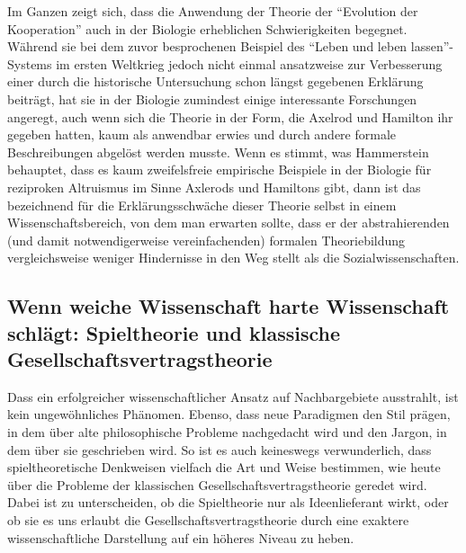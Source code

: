 \documentclass[12pt,a4paper,ngerman]{article}
\begin{document}
Im Ganzen zeigt sich, dass die Anwendung der Theorie der "`Evolution
der Kooperation"' auch in der Biologie erheblichen Schwierigkeiten
begegnet.  Während sie bei dem zuvor besprochenen Beispiel des "`Leben
und leben lassen"'-Systems im ersten Weltkrieg jedoch nicht einmal
ansatzweise zur Verbesserung einer durch die historische Untersuchung
schon längst gegebenen Erklärung beiträgt, hat sie in der Biologie
zumindest einige interessante Forschungen angeregt, auch wenn sich die
Theorie in der Form, die Axelrod und Hamilton ihr gegeben hatten, kaum
als anwendbar erwies und durch andere formale Beschreibungen abgelöst
werden musste. Wenn es stimmt, was Hammerstein behauptet, dass es kaum
zweifelsfreie empirische Beispiele in der Biologie für reziproken
Altruismus im Sinne Axlerods und Hamiltons gibt, dann ist das
bezeichnend für die Erklärungsschwäche dieser Theorie selbst in einem
Wissenschaftsbereich, von dem man erwarten sollte, dass er der
abstrahierenden (und damit notwendigerweise vereinfachenden) formalen
Theoriebildung vergleichsweise weniger Hindernisse in den Weg stellt
als die Sozialwissenschaften.


\subsection{Wenn weiche Wissenschaft harte Wissenschaft schlägt: Spieltheorie
und klassische Gesellschaftsvertragstheorie}

Dass ein erfolgreicher wissenschaftlicher Ansatz auf Nachbargebiete
ausstrahlt, ist kein ungewöhnliches Phänomen. Ebenso, dass neue
Paradigmen den Stil prägen, in dem über alte philosophische Probleme
nachgedacht wird und den Jargon, in dem über sie geschrieben wird. So
ist es auch keineswegs verwunderlich, dass spieltheoretische
Denkweisen vielfach die Art und Weise bestimmen, wie heute über die
Probleme der klassischen Gesellschaftsvertragstheorie geredet
wird. Dabei ist zu unterscheiden, ob die Spieltheorie nur als
Ideenlieferant wirkt, oder ob sie es uns erlaubt die
Gesellschaftsvertragstheorie durch eine exaktere wissenschaftliche
Darstellung auf ein höheres Niveau zu heben. 
\end{document}

